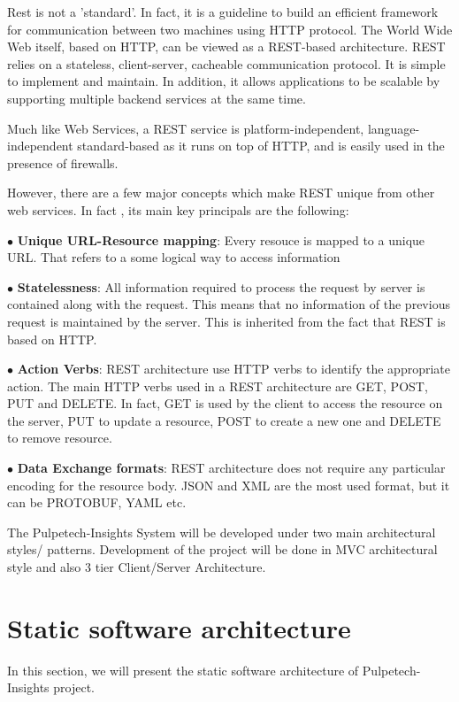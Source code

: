 Rest is not a ’standard’. In fact, it is a guideline to build an efficient framework for
communication between two machines using HTTP protocol. The World Wide Web itself,
based on HTTP, can be viewed as a REST-based architecture. REST relies on a stateless,
client-server, cacheable communication protocol. It is simple to implement and maintain.
In addition, it allows applications to be scalable by supporting multiple backend services
at the same time.

Much like Web Services, a REST service is platform-independent, language-independent
standard-based as it runs on top of HTTP, and is easily used in the presence of firewalls.

However, there are a few major concepts which make REST unique from other web
services. In fact , its main key principals are the following:

$\bullet$ \textbf{Unique URL-Resource mapping}: Every resouce is mapped to a unique URL.
That refers to a some logical way to access information

$\bullet$ \textbf{Statelessness}: All information required to process the request by server is contained along with the request. This means that no information of the previous request is
maintained by the server. This is inherited from the fact that REST is based on HTTP.

$\bullet$ \textbf{Action Verbs}: REST architecture use HTTP verbs to identify the appropriate
action. The main HTTP verbs used in a REST architecture are GET, POST, PUT and
DELETE. In fact, GET is used by the client to access the resource on the server, PUT to
update a resource, POST to create a new one and DELETE to remove resource.

$\bullet$ \textbf{Data Exchange formats}: REST architecture does not require any particular
encoding for the resource body. JSON \cite{json} and XML are the most used format, but it can
be PROTOBUF, YAML etc.

The Pulpetech-Insights System will be developed under two main architectural styles/ patterns. 
Development of the project will be done in MVC architectural style and also 3 tier Client/Server Architecture.

\section{Static software architecture}
In this section, we will present the static software architecture of Pulpetech-Insights project.
